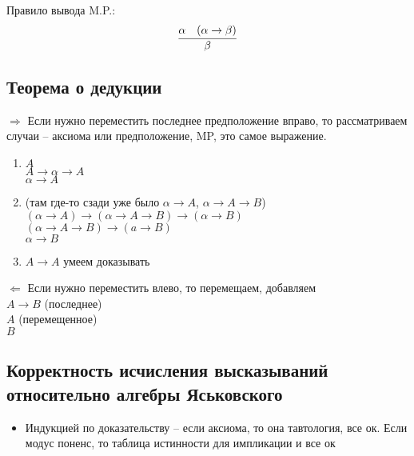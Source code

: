 Правило вывода M.P.:
\[\infer{\beta}{\alpha & (\alpha \rightarrow \beta)}\]
\subsection{Теорема о дедукции}
\label{sec-3-4}
$\Rightarrow$ Если нужно переместить последнее предположение вправо,
то рассматриваем случаи -- аксиома или предположение,
MP, это самое выражение.
\begin{enumerate}
\item $A$ \\
$A\to \alpha \to A$ \\
$\alpha \to A$
\item (там где-то сзади уже было $\alpha \to A$, $\alpha \to A \to B$) \\
$(\alpha \to A)\to (\alpha \to A \to B)\to (\alpha \to B)$ \\
$(\alpha \to A\to B)\to (a\to B)$ \\
$\alpha \to B$
\item $A\to A$ умеем доказывать
\end{enumerate}
$\Leftarrow$ Если нужно переместить влево, то перемещаем, добавляем \\
$A\to B$ (последнее) \\
$A$    (перемещенное) \\
$B$
\subsection{Корректность исчисления высказываний относительно алгебры Яськовского}
\label{sec-3-5}
\begin{itemize}
\item Индукцией по доказательству -- если аксиома, то она
тавтология, все ок. Если модус поненс, то таблица
истинности для импликации и все ок
\end{itemize}
